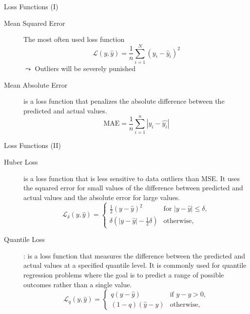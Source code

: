 \documentclass[aspectratio=169]{../latex_main/tntbeamer}  %
\begin{document}
    
    \begin{frame}[c]{Loss Functions (I)}

    \begin{description}
        \item[Mean Squared Error] The most often used loss function
        $$\mathcal{L}(y,\hat{y}) = \frac{1}{n} \sum_{i=1}^{N} (y_i - \hat{y}_i)^2$$
        $\leadsto$ Outliers will be severely punished
        \item[Mean Absolute Error] is a loss function that penalizes the absolute difference between the predicted and actual values.
        $$ \text{MAE}= \frac{1}{n} \sum_{i=1}^{n} |y_i - \hat{y_i}|$$
    \end{description}
        
    \end{frame}

        \begin{frame}[c]{Loss Functions (II)}

    \begin{description}
        \item[Huber Loss] is a loss function that is less sensitive to data outliers than MSE. It uses the squared error for small values of the difference between predicted and actual values and the absolute error for large values.
        $$\mathcal{L}_{\delta}(y,\hat{y}) = \begin{cases} \frac{1}{2}(y - \hat{y})^2 & \text{for } |y - \hat{y}| \leq \delta,\\ \delta(|y - \hat{y}| - \frac{1}{2}\delta) & \text{otherwise}, \end{cases} $$
        \item[Quantile Loss]: is a loss function that measures the difference between the predicted and actual values at a specified quantile level. It is commonly used for quantile regression problems where the goal is to predict a range of possible outcomes rather than a single value.
        $$\mathcal{L}_q(y,\hat{y}) = \begin{cases} q(y - \hat{y}) & \text{if } y - \hat{y} > 0,\\ (1-q)(\hat{y} - y) & \text{otherwise}, \end{cases}$$
    \end{description}
        
    \end{frame}
\end{document}
